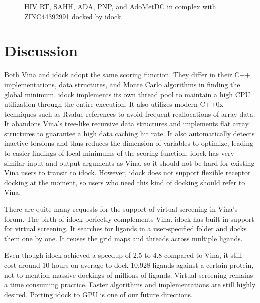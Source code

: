 \begin{figure}
{  \label{subfig:3BGS-ZINC44392991}
}
\caption{HIV RT, SAHH, ADA, PNP, and AdoMetDC in complex with ZINC44392991 docked by idock.}
\label{fig:idock-ZINC44392991}
\end{figure}

\section{Discussion}

Both Vina and idock adopt the same scoring function. They differ in their C++ implementations, data structures, and Monte Carlo algorithms in finding the global minimum. idock implements its own thread pool to maintain a high CPU utilization through the entire execution. It also utilizes modern C++0x techniques such as Rvalue references to avoid frequent reallocations of array data. It abandons Vina's tree-like recursive data structures and implements flat array structures to guarantee a high data caching hit rate. It also automatically detects inactive torsions and thus reduces the dimension of variables to optimize, leading to easier findings of local minimums of the scoring function. idock has very similar input and output arguments as Vina, so it should not be hard for existing Vina users to transit to idock. However, idock does not support flexible receptor docking at the moment, so users who need this kind of docking should refer to Vina.

There are quite many requests for the support of virtual screening in Vina's forum. The birth of idock perfectly complements Vina. idock has built-in support for virtual screening. It searches for ligands in a user-specified folder and docks them one by one. It reuses the grid maps and threads across multiple ligands.

Even though idock achieved a speedup of 2.5 to 4.8 compared to Vina, it still cost around 10 hours on average to dock 10,928 ligands against a certain protein, not to mention massive dockings of millions of ligands. Virtual screening remains a time consuming practice. Faster algorithms and implementations are still highly desired. Porting idock to GPU is one of our future directions.

